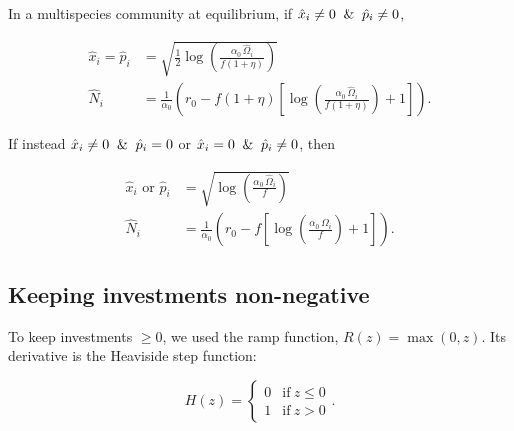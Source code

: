 In a multispecies community at equilibrium, 
if $\hat{x}_{i} \ne 0 \And \hat{p}_{i} \ne 0$,

\begin{equation}
\label{eq:analytical-sub-solns}
\begin{split}
    \hat{x}_i = \hat{p}_i &= \sqrt{\frac{1}{2} \log \left( 
        \frac{\alpha_0 \, \hat{\Omega}_i}{f (1 + \eta)}  \right)} \\
    \hat{N}_i &= \frac{1}{\alpha_0} \left(
        r_0 - f (1 + \eta) \left[
            \log\left( \frac{\alpha_0 \, \hat{\Omega}_i }{f (1 + \eta)}
            \right) + 1 
        \right]
    \right)
    \text{.}
\end{split}
\end{equation}

If instead $\hat{x}_i \ne 0 \And \hat{p}_i = 0$ or
$\hat{x}_i = 0 \And \hat{p}_i \ne 0$, then 

\begin{equation}
\label{eq:analytical-super-solns}
\begin{split}
    \hat{x}_i \textrm{ or } \hat{p}_i &= \sqrt{\log \left( 
            \frac{\alpha_0 \, \hat{\Omega}_i}{f} 
        \right)} \\
    \hat{N}_i &= \frac{1}{\alpha_0} \left(
        r_0 - f \left[
            \log\left( \frac{\alpha_0 \, \hat{\Omega}_i }{f}
            \right) + 1 
        \right]
    \right)
    \text{.}
\end{split}
\end{equation}




\subsection*{Keeping investments non-negative}

To keep investments $\ge 0$, we used the ramp function, $R(z) = \max(0,z)$. 
Its derivative is the Heaviside step function:

\begin{equation*}
    H(z) = \begin{cases}
        0 & \text{if}\ z \le 0 \\
        1 & \text{if}\ z > 0
        \end{cases}
    \text{.}
\end{equation*}


